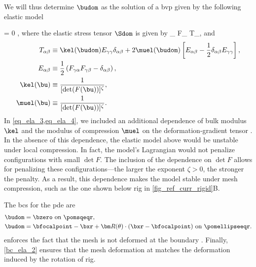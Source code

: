 We will thus determine $\budom$ as the solution of a \ac{bvp} given by the following elastic model \cite{kamenskyLectureNotesMAE,marsdenMathematicalFoundationsElasticity1994}

\be\label{eq_mesh_fluid_rigid}
\pder{\Sdom_{\alpha \beta}(\budom)}{\xr^\beta} = 0  \omr,
\ee
where the elastic stress tensor $\Sdom$ is given by
\be
\label{eq_def_S}
\Sdom_{\alpha \beta} \equiv F_{\alpha \gamma} T_{\gamma \beta},
\ee
and
\begin{align}
    \label{eq_ela_1}
    T_{\alpha \beta} & \equiv \kel(\budom) E_{\gamma \gamma} \delta_{\alpha \beta} +2 \muel(\budom) \left[E_{\alpha \beta} - \frac{1}{2} \delta_{\alpha \beta} E_{\gamma \gamma}\right], \\
    \label{eq_ela_2}
    E_{\alpha \beta} & \equiv \frac{1}{2}\left( F_{\gamma \alpha}F_{\gamma \beta} - \delta_{\alpha \beta}\right),                                                                        \\
    \label{eq_ela_3}
    \kel(\bu)        & \equiv \frac{1}{[\det(F(\bu))]^\zeta},                                                                                                                            \\
    \label{eq_ela_4}
    \muel(\bu)       & \equiv \frac{1}{[\det(F(\bu))]^\zeta}.
\end{align}
In \cref{eq_ela_3,eq_ela_4}, we included an additional dependence of bulk modulus $\kel$ and the modulus of compression $\muel$ on the deformation-gradient tensor . In the absence of this dependence, the elastic model above would be unstable under local compression. In fact, the model's Lagrangian would not penalize configurations with  small $\det F$. The inclusion of the dependence  on $\det F$  allows for penalizing these configurations---the larger the exponent $\zeta > 0$, the stronger the penalty. As a result, this dependence makes the model stable under mesh compression, such as the one shown below \ac{rig} in \cref{fig_ref_curr_rigid}B.

The \acp{bc} for the  \ac{pde}  are
\begin{align}
    \label{bc_ela_1}
    \budom & =\bzero \text{ on } \pomsqeqr,                                                                 \\
    \label{bc_ela_2}
    \budom & = \bfocalpoint - \bxr + {\bm R}(\theta)\cdot (\bxr - \bfocalpoint) \text{ on } \pomellipseeqr.
\end{align}
 enforces the fact that the mesh is not deformed at the boundary \pomsqr. Finally,  \cref{bc_ela_2} ensures that the mesh deformation at \pomellipser  matches the deformation induced by the rotation of \ac{rig}.


